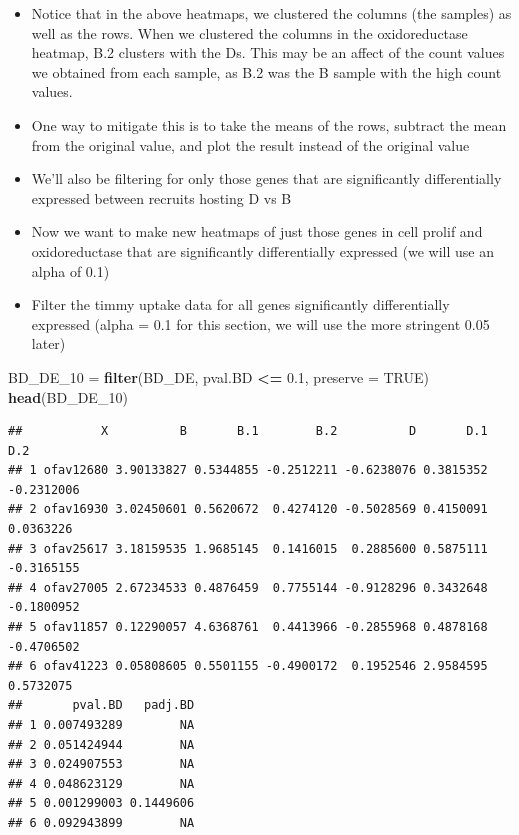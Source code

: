 \documentclass[
]{article}
\newenvironment{Shaded}{\begin{snugshade}}{\end{snugshade}}
\newcommand{\DataTypeTok}[1]{\textcolor[rgb]{0.13,0.29,0.53}{#1}}
\newcommand{\DecValTok}[1]{\textcolor[rgb]{0.00,0.00,0.81}{#1}}
\newcommand{\FloatTok}[1]{\textcolor[rgb]{0.00,0.00,0.81}{#1}}
\newcommand{\KeywordTok}[1]{\textcolor[rgb]{0.13,0.29,0.53}{\textbf{#1}}}
\newcommand{\NormalTok}[1]{#1}
\newcommand{\OperatorTok}[1]{\textcolor[rgb]{0.81,0.36,0.00}{\textbf{#1}}}
\newcommand{\OtherTok}[1]{\textcolor[rgb]{0.56,0.35,0.01}{#1}}
\newcommand{\StringTok}[1]{\textcolor[rgb]{0.31,0.60,0.02}{#1}}
\begin{document}
\begin{itemize}
\item
  Notice that in the above heatmaps, we clustered the columns (the
  samples) as well as the rows. When we clustered the columns in the
  oxidoreductase heatmap, B.2 clusters with the Ds. This may be an
  affect of the count values we obtained from each sample, as B.2 was
  the B sample with the high count values.
\item
  One way to mitigate this is to take the means of the rows, subtract
  the mean from the original value, and plot the result instead of the
  original value
\item
  We'll also be filtering for only those genes that are significantly
  differentially expressed between recruits hosting D vs B
\item
  Now we want to make new heatmaps of just those genes in cell prolif
  and oxidoreductase that are significantly differentially expressed (we
  will use an alpha of 0.1)
\item
  Filter the timmy uptake data for all genes significantly
  differentially expressed (alpha = 0.1 for this section, we will use
  the more stringent 0.05 later)
\end{itemize}

\begin{Shaded}
\begin{Highlighting}[]
\NormalTok{BD_DE_}\DecValTok{10}\NormalTok{ =}\StringTok{ }\KeywordTok{filter}\NormalTok{(BD_DE, pval.BD }\OperatorTok{<=}\StringTok{ }\FloatTok{0.1}\NormalTok{, }\DataTypeTok{preserve =} \OtherTok{TRUE}\NormalTok{)}
\KeywordTok{head}\NormalTok{(BD_DE_}\DecValTok{10}\NormalTok{) }
\end{Highlighting}
\end{Shaded}

\begin{verbatim}
##           X          B       B.1        B.2          D       D.1        D.2
## 1 ofav12680 3.90133827 0.5344855 -0.2512211 -0.6238076 0.3815352 -0.2312006
## 2 ofav16930 3.02450601 0.5620672  0.4274120 -0.5028569 0.4150091  0.0363226
## 3 ofav25617 3.18159535 1.9685145  0.1416015  0.2885600 0.5875111 -0.3165155
## 4 ofav27005 2.67234533 0.4876459  0.7755144 -0.9128296 0.3432648 -0.1800952
## 5 ofav11857 0.12290057 4.6368761  0.4413966 -0.2855968 0.4878168 -0.4706502
## 6 ofav41223 0.05808605 0.5501155 -0.4900172  0.1952546 2.9584595  0.5732075
##       pval.BD   padj.BD
## 1 0.007493289        NA
## 2 0.051424944        NA
## 3 0.024907553        NA
## 4 0.048623129        NA
## 5 0.001299003 0.1449606
## 6 0.092943899        NA
\end{verbatim}
\end{document}
